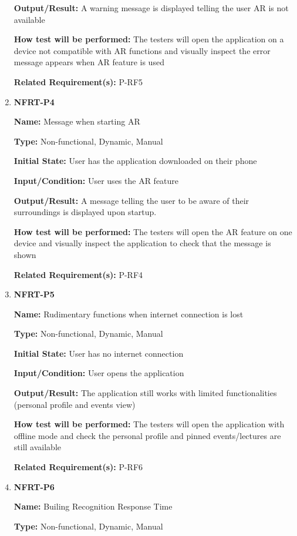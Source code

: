 \documentclass[12pt, titlepage]{article}
\begin{document}
\begin{enumerate}
\textbf{Output/Result:} A warning message is displayed telling the user AR is not available

\textbf{How test will be performed:} The testers will open the application on a device not compatible with AR functions and visually inspect the error message appears when AR feature is used

\textbf{Related Requirement(s):} P-RF5

\item{\textbf{NFRT-P4}}

\textbf{Name:} Message when starting AR 

\textbf{Type:} Non-functional, Dynamic, Manual
					
\textbf{Initial State:} User has the application downloaded on their phone
					
\textbf{Input/Condition:} User uses the AR feature
					
\textbf{Output/Result:} A message telling the user to be aware of their surroundings is displayed upon startup.

\textbf{How test will be performed:} The testers will open the AR feature on one device and visually inspect the application to check that the message is shown

\textbf{Related Requirement(s):} P-RF4

\item{\textbf{NFRT-P5}}

\textbf{Name:} Rudimentary functions when internet connection is lost

\textbf{Type:} Non-functional, Dynamic, Manual
					
\textbf{Initial State:} User has no internet connection
					
\textbf{Input/Condition:} User opens the application
					
\textbf{Output/Result:} The application still works with limited functionalities (personal profile and events view)

\textbf{How test will be performed:} The testers will open the application with offline mode and check the personal profile and pinned events/lectures are still available

\textbf{Related Requirement(s):} P-RF6

\item{\textbf{NFRT-P6}}

\textbf{Name:} Builing Recognition Response Time

\textbf{Type:} Non-functional, Dynamic, Manual
					

\end{enumerate}
\end{document}
